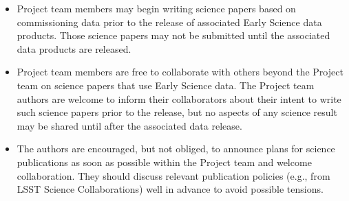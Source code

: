 \documentclass[SE,authoryear,toc,lsstdraft]{lsstdoc}
\begin{document}

\begin{itemize}

  \item Project team members may begin writing science papers based on commissioning data prior to the release of associated Early Science data products.
  Those science papers may not be submitted until the associated data products are released.

  \item Project team members are free to collaborate with others beyond the Project team on science papers that use Early Science data.
  The Project team authors are welcome to inform their collaborators about their intent to write such science papers prior to the release, but no aspects of any science result may be shared until after the associated data release.

  \item The authors are encouraged, but not obliged, to announce plans for science publications as soon as possible within the Project team and welcome collaboration.
  They should discuss relevant publication policies (e.g., from LSST Science Collaborations) well in advance to avoid possible tensions.






\end{itemize}
\end{document}
